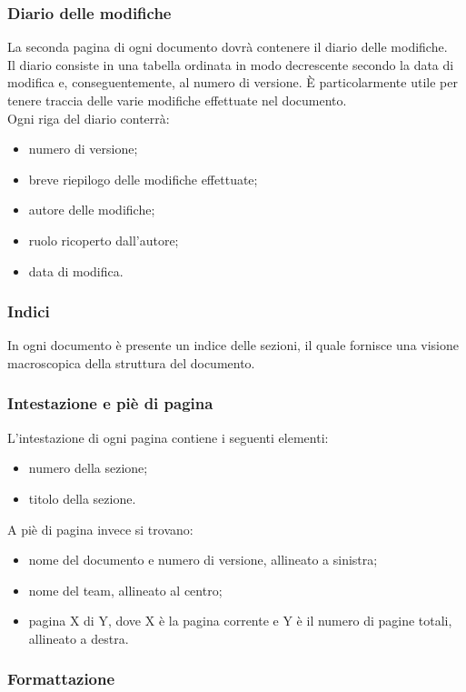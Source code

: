 		\subsubsection{Diario delle modifiche}
		La seconda pagina di ogni documento dovrà contenere il diario delle modifiche.\\
		Il diario consiste in una tabella ordinata in modo decrescente secondo la data di modifica e, conseguentemente, al numero di versione. È particolarmente utile per tenere traccia delle varie modifiche effettuate nel documento. \\
		Ogni riga del diario conterrà:
		\begin{itemize}
			\item numero di versione;
			\item breve riepilogo delle modifiche effettuate;
			\item autore delle modifiche;
			\item ruolo ricoperto dall'autore;
			\item data di modifica.
		\end{itemize}		
		\subsubsection{Indici}
		In ogni documento è presente un indice delle sezioni, il quale fornisce una visione macroscopica della struttura del documento.
		\subsubsection{Intestazione e piè di pagina}
		L'intestazione di ogni pagina contiene i seguenti elementi:
		\begin{itemize}
			\item numero della sezione;
			\item titolo della sezione.
		\end{itemize}
		A piè di pagina invece si trovano:
		\begin{itemize}
			\item nome del documento e numero di versione, allineato a sinistra;
			\item nome del team, allineato al centro;
			\item pagina X di Y, dove X è la pagina corrente e Y è il numero di pagine totali, allineato a destra.
		\end{itemize}
		\subsubsection{Formattazione}
		
